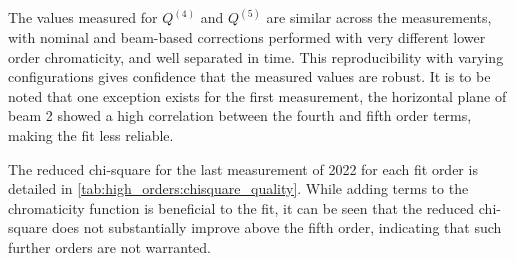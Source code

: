 \subsubsection{}
\label{subsection:q4q5_quality}

The values measured for $Q^{(4)}$ and $Q^{(5)}$ are similar across the measurements, with
nominal and beam-based corrections performed with very different lower order chromaticity, and well 
separated in time.
This reproducibility with varying configurations gives confidence that the measured values are
robust. It is to be noted that one exception exists for the first measurement, the horizontal plane
of beam 2 showed a high correlation between the fourth and fifth order terms, making the fit less
reliable.

The reduced chi-square for the last measurement of 2022 for each fit order is detailed in
\cref{tab:high_orders:chisquare_quality}. While adding terms to the chromaticity function is
beneficial to the fit, it can be seen that the reduced chi-square does not substantially improve 
above the fifth order, indicating that such further orders are not warranted.

